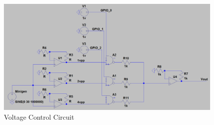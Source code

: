 \documentclass{article}	%
\begin{document}
\begin{figure}[!hbt]
\begin{center}
\includegraphics[width=1.0\textwidth,keepaspectratio]{voltage_control_circuit.png}
\end{center}
\caption{Voltage Control Circuit}
\end{figure}

%

%
%
%
%
%
%
%

%
\end{document}
